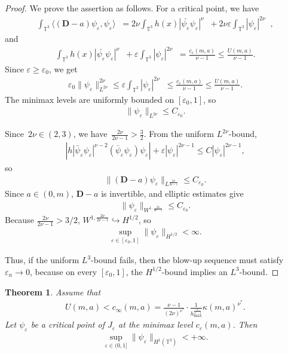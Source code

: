 \documentclass[11pt,final]{amsart}
\newcommand{\T}{\mathbb{T}}
\newcommand{\dd}{\mathop{}\!\mathrm{d}}
\newcommand{\eps}{\varepsilon}
\newcommand{\pD}{\mathbf{D}}
\DeclareMathOperator{\dv}{\dd{vol}}
\newtheorem{thm}{Theorem}[section]
\begin{document}
\begin{proof}

We prove the assertion as follows. For a critical point, we have
\begin{align}
\int_{\T^3}\langle(\pD-a)\psi_\eps,\psi_\eps\rangle\dv
=
2\nu \int_{\T^3}h(x)|\bar{\psi_\eps}\psi_\eps|^{\nu}\dv+2\nu\eps \int_{\T^3}|\psi_\eps|^{2\nu}\dv,
\end{align}
and
\begin{align}
\int_{\T^3}h(x)|\bar{\psi_\eps}\psi_\eps|^{\nu}\dv+\eps \int_{\T^3}|\psi_\eps|^{2\nu}\dv
=
\frac{c_\eps(m,a)}{\nu-1}\le
\frac{U(m,a)}{\nu-1}.
\end{align}
Since $\eps\ge\eps_0$, we get
\begin{align}
\eps_0\|\psi_\eps\|_{L^{2\nu}}^{2\nu}
\le
\eps \int_{\T^3}|\psi_\eps|^{2\nu}\dv
\le
\frac{c_\eps(m,a)}{\nu-1}\le
\frac{U(m,a)}{\nu-1}.
\end{align}
The minimax levels are uniformly bounded on $[\eps_0,1]$, so
\begin{align}
\|\psi_\eps\|_{L^{2\nu}}\le C_{\eps_0}.
\end{align}


Since~$2\nu\in (2,3)$, we have~$\frac{2\nu}{2\nu-1}>\frac{3}{2}$. From the uniform $L^{2\nu}$-bound,
\begin{align}
\left|
h|\bar\psi_\eps\psi_\eps|^{\nu-2}
(\bar\psi_\eps\psi_\eps)\psi_\eps
\right|
+
\eps|\psi_\eps|^{2\nu-1}
\le C|\psi_\eps|^{2\nu-1},
\end{align}
so
\begin{align}
\|(\pD-a)\psi_\eps\|_{L^{\frac{2\nu}{2\nu-1}}}\le C_{\eps_0}.
\end{align}
Since $a\in(0,m)$, $\pD-a$ is invertible, and elliptic estimates give
\begin{align}
\|\psi_\eps\|_{W^{1,\frac{2\nu}{2\nu-1}}}\le C_{\eps_0}.
\end{align}
Because $\frac{2\nu}{2\nu-1}>3/2$,
$W^{1,\frac{2\nu}{2\nu-1}}\hookrightarrow H^{1/2}$,
so
\begin{align}
\sup_{\eps\in[\eps_0,1]}
\|\psi_\eps\|_{H^{1/2}}<\infty.
\end{align}

Thus, if the uniform $L^3$-bound fails, then the blow-up sequence must satisfy $\eps_n\to0$, because on every $[\eps_0,1]$, the $H^{1/2}$-bound implies an $L^3$-bound.

\end{proof}



\begin{thm}
\label{thm:Soler-subthreshold}
Assume that
\begin{align}
U(m,a)<c_\infty(m,a)=\frac{\nu-1}{(2\nu)^{\nu^*}}\cdot\frac{1}{h_{\max}^{\frac{1}{\nu-1}}}\kappa(m,a)^{\nu^*}.
\end{align}
Let $\psi_\eps$ be a critical point of $J_\eps$ at the
minimax level $c_\eps(m,a)$. Then
\begin{align}
\sup_{\eps\in(0,1]}
\|\psi_\eps\|_{H^1(\T^3)}<+\infty.
\end{align}
\end{thm}
\end{document}

